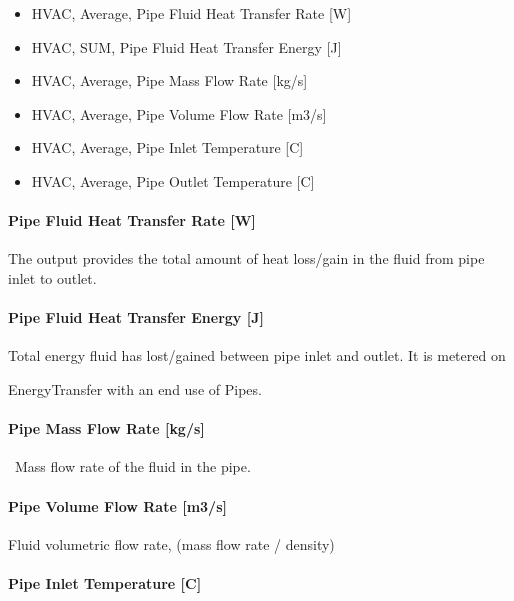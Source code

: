 \begin{itemize}
\item
  HVAC, Average, Pipe Fluid Heat Transfer Rate {[}W{]}
\item
  HVAC, SUM, Pipe Fluid Heat Transfer Energy {[}J{]}
\item
  HVAC, Average, Pipe Mass Flow Rate {[}kg/s{]}
\item
  HVAC, Average, Pipe Volume Flow Rate {[}m3/s{]}
\item
  HVAC, Average, Pipe Inlet Temperature {[}C{]}
\item
  HVAC, Average, Pipe Outlet Temperature {[}C{]}
\end{itemize}

\paragraph{Pipe Fluid Heat Transfer Rate {[}W{]}}\label{pipe-fluid-heat-transfer-rate-w-2}

The output provides the total amount of heat loss/gain in the fluid from pipe inlet to outlet.

\paragraph{Pipe Fluid Heat Transfer Energy {[}J{]}}\label{pipe-fluid-heat-transfer-energy-j-2}

Total energy fluid has lost/gained between pipe inlet and outlet. It is metered on

EnergyTransfer with an end use of Pipes.

\paragraph{Pipe Mass Flow Rate {[}kg/s{]}}\label{pipe-mass-flow-rate-kgs-2}

~Mass flow rate of the fluid in the pipe.

\paragraph{Pipe Volume Flow Rate {[}m3/s{]}}\label{pipe-volume-flow-rate-m3s-2}

Fluid volumetric flow rate, (mass flow rate / density)

\paragraph{Pipe Inlet Temperature {[}C{]}}\label{pipe-inlet-temperature-c-2}

